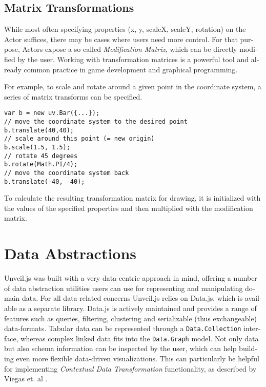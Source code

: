 \begin{english}
\subsection{Matrix Transformations}

While most often specifying properties (x, y, scaleX, scaleY, rotation) on the Actor suffices, there may be cases where users need more control. For that purpose, Actors expose a so called \emph{Modification Matrix}, which can be directly modified by the user. Working with transformation matrices is a powerful tool and already common practice in game development and graphical programming.

\SuperPar For example, to scale and rotate around a given point in the coordinate system, a series of matrix transforms can be specified.

\begin{verbatim}
var b = new uv.Bar({...});
// move the coordinate system to the desired point
b.translate(40,40);
// scale around this point (= new origin)
b.scale(1.5, 1.5);
// rotate 45 degrees
b.rotate(Math.PI/4);
// move the coordinate system back
b.translate(-40, -40);
\end{verbatim}

\SuperPar To calculate the resulting transformation matrix for drawing, it is initialized with the values of the specified properties and then multiplied with
the modification matrix.

\section{Data Abstractions}
\label{cha:dataabstractions}

Unveil.js was built with a very data-centric approach in mind, offering a number of data abstraction utilities users can use for representing and manipulating domain data. For all data-related concerns Unveil.js relies on Data.js, which is available as a separate library. Data.js is actively maintained and provides a range of features such as queries, filtering, clustering and serializable (thus exchangeable) data-formats. Tabular data can be represented through a \texttt{Data.Collection} interface, whereas complex linked data fits into the \texttt{Data.Graph} model. Not only data but also schema information can be inspected by the user, which can help building even more flexible data-driven visualizations. This can particularly be helpful for implementing \emph{Contextual Data Transformation} functionality, as described by Viegas et. al \cite{manyeyes}.


\end{english}
